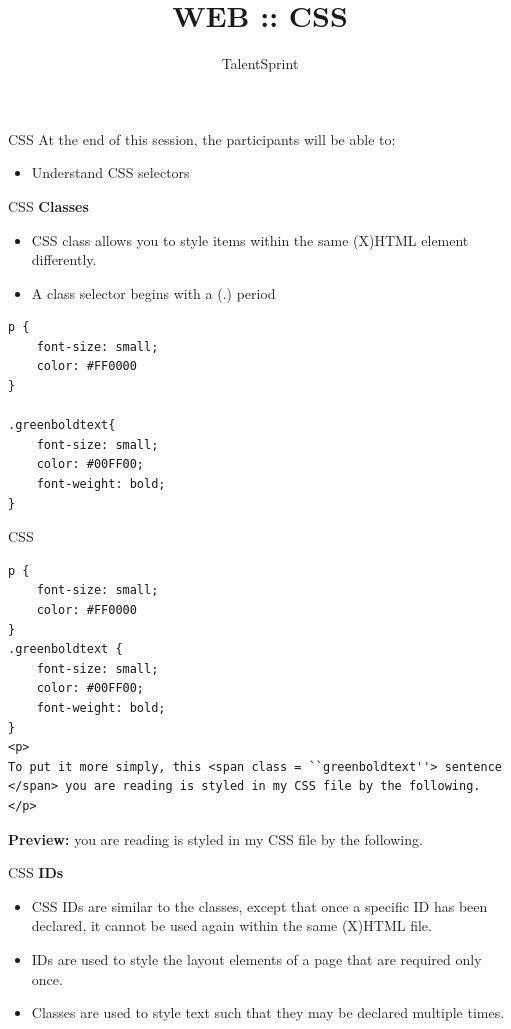 \documentclass[14pt]{beamer}
\title{WEB :: CSS}
\author[TS]{TalentSprint}
\institute[L\&D]{Licensed To Skill}
\begin{document}
\begin{frame}
  \titlepage
\end{frame}

\begin{frame}{CSS}
At the end of this session, the participants will be able to:
  \begin{itemize}
  \item Understand CSS selectors
  \end{itemize}
\end{frame}

\begin{frame}[fragile]{CSS}
\textbf{Classes}
\begin{itemize}
 \item CSS class allows you to style items within the same (X)HTML element differently.
 \item A class selector begins with a (.) period
\end{itemize}
\begin{lstlisting}[xleftmargin=30pt]
p {
    font-size: small;
    color: #FF0000
}

.greenboldtext{
    font-size: small;
    color: #00FF00;
    font-weight: bold;
}
\end{lstlisting}
\end{frame}

\begin{frame}[fragile]{CSS}
\begin{lstlisting}[xleftmargin=20pt]
p {
    font-size: small;
    color: #FF0000
}
.greenboldtext {
    font-size: small;
    color: #00FF00;
    font-weight: bold;
}
<p>
To put it more simply, this <span class = ``greenboldtext''> sentence </span> you are reading is styled in my CSS file by the following.
</p>
\end{lstlisting}
\small
\textbf{Preview:}
\color{red}{To put it more simply, this} \textbf{\color{green}{sentence}} you are reading is styled in my CSS file by the following.
\end{frame}

\begin{frame}{CSS}
\textbf{IDs}
\begin{itemize}
 \item CSS IDs are similar to the classes, except that once a specific ID has been declared, it cannot be used again within the same (X)HTML file.
 \item IDs are used to style the layout elements of a page that are required only once.
 \item Classes are used to style text such that they may be declared multiple times.
\end{itemize}
\end{frame}
\end{document}
